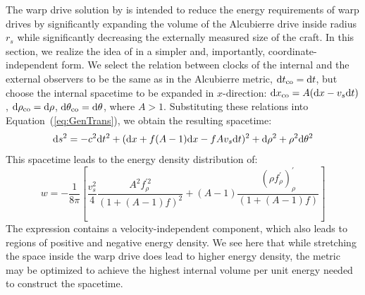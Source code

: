 \documentclass[10pt]{iopart}
\begin{document}
The warp drive solution by \cite{vandenBroeck1999} is intended to reduce the energy requirements of warp drives by significantly expanding the volume of the Alcubierre drive inside radius $r_s$ while significantly decreasing the externally measured size of the craft. %
In this section, we realize the idea of \cite{vandenBroeck1999} in a simpler and, importantly, coordinate-independent form. We select the relation between clocks of the internal and the external observers to be the same as in the Alcubierre metric, ${\rm d}t_{\rm co}={\rm d}t$, but choose the internal spacetime to be expanded in $x$-direction: ${\rm d}x_{\rm co}=A({\rm d}x
-v_s{\rm d}t)$, ${\rm d}\rho_{\rm co}={\rm d}\rho$, ${\rm d}\theta_{\rm co}={\rm d}\theta$, where $A>1$. Substituting these relations into Equation~(\ref{eq:GenTrans}), we obtain the resulting spacetime:
\begin{equation}
    {\rm d}s^2=-c^2 {\rm d}t^2 + ({\rm d}x + f(A-1){\rm d}x-fAv_s{\rm d}t)^2 + {\rm d}\rho^2 + \rho^2{\rm d}\theta^2
\end{equation}
This spacetime leads to the energy density distribution of:
\begin{equation}
    w=-\frac{1}{8\pi}\left[\frac{v_s^2}{4}\frac{A^2f^{\prime 2}_{\rho}}{(1+(A-1)f)^2}+(A-1)\frac{(\rho f^\prime_\rho)^\prime_\rho}{(1+(A-1)f)}\right]
\end{equation}
The expression contains a velocity-independent component, which also leads to regions of positive and negative energy density. We see here that while stretching the space inside the warp drive does lead to higher energy density, the metric may be optimized to achieve the highest internal volume per unit energy needed to construct the spacetime.
\end{document}
